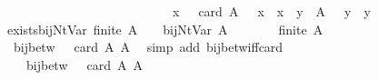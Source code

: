 \begin{isabellebody}
\ \ \ \ \ \ \ \ \ \ \ \ \ \ \ \ \ \ \ \ \ \ \ \ \ \ {\isasymand}\ {\isacharparenleft}{\kern0pt}{\isasymforall}x\ {\isasymin}\ {\isacharbraceleft}{\kern0pt}{\isachardot}{\kern0pt}{\isachardot}{\kern0pt}{\isacharless}{\kern0pt}\ card\ A{\isacharbraceright}{\kern0pt}{\isachardot}{\kern0pt}\ {\isasymgamma}{\isacharprime}{\kern0pt}\ {\isacharparenleft}{\kern0pt}{\isasymgamma}\ x{\isacharparenright}{\kern0pt}\ {\isacharequal}{\kern0pt}\ x{\isacharparenright}{\kern0pt}\ {\isasymand}\ {\isacharparenleft}{\kern0pt}{\isasymforall}y\ {\isasymin}\ A{\isachardot}{\kern0pt}\ {\isasymgamma}\ {\isacharparenleft}{\kern0pt}{\isasymgamma}{\isacharprime}{\kern0pt}\ y{\isacharparenright}{\kern0pt}\ {\isacharequal}{\kern0pt}\ y{\isacharparenright}{\kern0pt}{\isachardoublequoteclose}\isanewline
\isanewline
{}\isamarkupfalse%
\ exists{\isacharunderscore}{\kern0pt}bij{\isacharunderscore}{\kern0pt}Nt{\isacharunderscore}{\kern0pt}Var{\isacharcolon}{\kern0pt}\ {\isachardoublequoteopen}finite\ A\ {\isasymLongrightarrow}\ {\isasymexists}{\isasymgamma}\ {\isasymgamma}{\isacharprime}{\kern0pt}{\isachardot}{\kern0pt}\ bij{\isacharunderscore}{\kern0pt}Nt{\isacharunderscore}{\kern0pt}Var\ A\ {\isasymgamma}\ {\isasymgamma}{\isacharprime}{\kern0pt}{\isachardoublequoteclose}\isanewline
%
\isadelimproof
%
\endisadelimproof
%
\isatagproof
{}\isamarkupfalse%
\ {\isacharminus}{\kern0pt}\isanewline
\ \ \isamarkupfalse%
\ {\isachardoublequoteopen}finite\ A{\isachardoublequoteclose}\isanewline
\ \ \isamarkupfalse%
\ \isamarkupfalse%
\ {\isachardoublequoteopen}{\isasymexists}{\isasymgamma}{\isachardot}{\kern0pt}\ bij{\isacharunderscore}{\kern0pt}betw\ {\isasymgamma}\ {\isacharbraceleft}{\kern0pt}{\isachardot}{\kern0pt}{\isachardot}{\kern0pt}{\isacharless}{\kern0pt}\ card\ A{\isacharbraceright}{\kern0pt}\ A{\isachardoublequoteclose}\ \isamarkupfalse%
\ {\isacharparenleft}{\kern0pt}simp\ add{\isacharcolon}{\kern0pt}\ bij{\isacharunderscore}{\kern0pt}betw{\isacharunderscore}{\kern0pt}iff{\isacharunderscore}{\kern0pt}card{\isacharparenright}{\kern0pt}\isanewline
\ \ \isamarkupfalse%
\ \isamarkupfalse%
\ {\isasymgamma}\ \ {}{\isacharcolon}{\kern0pt}\ {\isachardoublequoteopen}bij{\isacharunderscore}{\kern0pt}betw\ {\isasymgamma}\ {\isacharbraceleft}{\kern0pt}{\isachardot}{\kern0pt}{\isachardot}{\kern0pt}{\isacharless}{\kern0pt}\ card\ A{\isacharbraceright}{\kern0pt}\ A{\isachardoublequoteclose}\ \isamarkupfalse%

\end{isabellebody}
